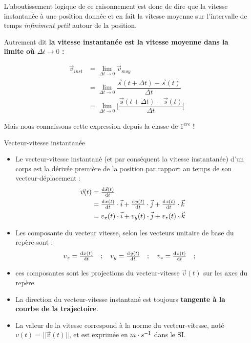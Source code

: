 \documentclass[11pt,a4paper]{article}
\begin{document}
L'aboutissement logique de ce raisonnement est donc de dire que la vitesse instantanée à une position donnée et en fait la vitesse moyenne sur l’intervalle de temps \textit{infiniment petit} autour de la position.

Autrement dit \textbf{la vitesse instantanée est la vitesse moyenne dans la limite où $\Delta t \rightarrow 0 $ :}

\begin{align*}
    \Vec{v}_{inst} &= \lim_{\Delta t \to 0} \Vec{v}_{moy} \\ 
    &= \lim_{\Delta t \to 0} \dfrac{\Vec{s}(t + \Delta t) - \Vec{s}(t)}{\Delta t} \\
    &= \lim_{\Delta t \to 0} \Bigg[ \dfrac{\Vec{s}(t + \Delta t) - \Vec{s}(t)}{\Delta t} \Bigg]
\end{align*}

Mais nous connaissons cette expression depuis la classe de $1^{ere}$ !

\begin{defn}{Vecteur-vitesse instantanée}
\begin{itemize}
    \item Le vecteur-vitesse instantané (et par conséquent la vitesse instantanée) d’un corps est la dérivée première de la position par rapport au temps de son vecteur-déplacement : 
    \begin{align*}
        \Vec{v}(t) &= \od{\Vec{s}(t)}{t} \\
        &= \od{x(t)}{t}\cdot \Vec{i} + \od{y(t)}{t}\cdot \Vec{j} + \od{z(t)}{t}\cdot \Vec{k} \\
        &= v_x(t)\cdot \Vec{i} + v_y(t)\cdot \Vec{j} + v_z(t)\cdot \Vec{k}
    \end{align*}
    \item Les composante du vecteur vitesse, selon les vecteurs unitaire de base du repère sont : 
    \[
    v_x = \od{x(t)}{t} \quad ; \quad v_y = \od{y(t)}{t} \quad ; \quad v_z = \od{z(t)}{t} \quad ; \quad 
    \]
    \item ces composantes sont les projections du vecteur-vitesse $\vec{v}(t)$ sur les axes du repère.
    \item La direction du vecteur-vitesse instantané est toujours \textbf{tangente à la courbe de la trajectoire}.
    \item La valeur de la vitesse correspond à la norme du vecteur-vitesse, noté $v(t) = ||\vec{v}(t)||$, et est exprimée en$\; m\cdot s^{-1}$  dans le SI. 
\end{itemize}
\end{defn}
\end{document}
